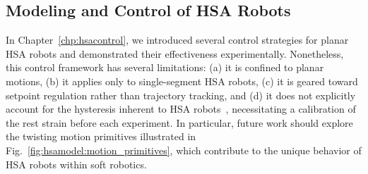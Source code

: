 \subsection{Modeling and Control of HSA Robots}
In Chapter~\ref{chp:hsacontrol}, we introduced several control strategies for planar \gls{HSA} robots and demonstrated their effectiveness experimentally. Nonetheless, this control framework has several limitations: (a) it is confined to planar motions, (b) it applies only to single-segment \gls{HSA} robots, (c) it is geared toward setpoint regulation rather than trajectory tracking, and (d) it does not explicitly account for the hysteresis inherent to HSA robots~\citep{truby2021recipe}, necessitating a calibration of the rest strain before each experiment. In particular, future work should explore the twisting motion primitives illustrated in Fig.~\ref{fig:hsamodel:motion_primitives}, which contribute to the unique behavior of \gls{HSA} robots within soft robotics.

